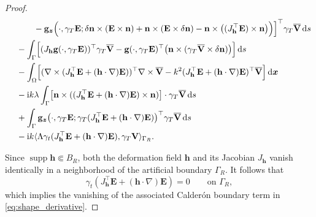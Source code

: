 \documentclass[12pt,reqno]{amsart}
\theoremstyle{definition}
\numberwithin{equation}{section}
\begin{document}
\begin{proof}
\begin{equation}
\begin{aligned}
&\qquad \quad - \mathbf{g}_{\boldsymbol{z}} \Bigl( \cdot, \gamma_T \mathbf{E}; \delta\mathbf{n} \times (\mathbf{E} \times \mathbf{n}) + \mathbf{n} \times (\mathbf{E} \times \delta \mathbf{n}) - \mathbf{n} \times \bigl( (J_{\mathbf{h}}^{\top}\mathbf{E}) \times \mathbf{n} \bigr) \Bigr) \Bigr]^{\top} \gamma_T\overline{\mathbf{V}} \, \mathrm{d}s \\
&\quad - \int_\Gamma \Bigl[ (J_{\mathbf{h}}\mathbf{g}(\cdot, \gamma_T \mathbf{E}))^{\top} \gamma_T\overline{\mathbf{V}} - \mathbf{g}(\cdot, \gamma_T \mathbf{E})^{\top} \bigl( \mathbf{n} \times (\gamma_T\overline{\mathbf{V}} \times \delta \mathbf{n}) \bigr) \Bigr] \, \mathrm{d}s \\
&\quad - \int_\Omega \Bigl[ (\nabla \times (J_{\mathbf{h}}^{\top}\mathbf{E} + (\mathbf{h} \cdot \nabla) \mathbf{E}))^{\top} \nabla \times \overline{\mathbf{V}} - k^2 (J_{\mathbf{h}}^{\top}\mathbf{E} + (\mathbf{h} \cdot \nabla) \mathbf{E})^{\top} \overline{\mathbf{V}} \Bigr] \, \mathrm{d}\boldsymbol{x} \\
&\quad - \mathrm{i}k\lambda \int_\Gamma \bigl[ \mathbf{n} \times ((J_{\mathbf{h}}^{\top}\mathbf{E} + (\mathbf{h} \cdot \nabla) \mathbf{E}) \times \mathbf{n}) \bigr] \cdot \gamma_T\overline{\mathbf{V}} \, \mathrm{d}s \\
&\quad + \int_\Gamma \mathbf{g}_{\boldsymbol{z}} \bigl( \cdot, \gamma_T \mathbf{E}; \gamma_T(J_{\mathbf{h}}^{\top}\mathbf{E} + (\mathbf{h} \cdot \nabla) \mathbf{E}) \bigr)^{\top} \gamma_T\overline{\mathbf{V}} \, \mathrm{d}s \\
&\quad - \mathrm{i}k \langle \Lambda \gamma_t (J_{\mathbf{h}}^{\top}\mathbf{E} + (\mathbf{h} \cdot \nabla) \mathbf{E}), \gamma_T \mathbf{V} \rangle_{\Gamma_R}.
\end{aligned}
\end{equation}

Since $\operatorname{supp} \mathbf{h} \Subset B_R$, both the deformation field $\mathbf{h}$ and its Jacobian $J_{\mathbf{h}}$ vanish identically in a neighborhood of the artificial boundary $\Gamma_R$. It follows that
\[
\gamma_t(J_{\mathbf{h}}^{\top}\mathbf{E} + (\mathbf{h} \cdot \nabla) \mathbf{E}) = 0 \qquad \text{on } \Gamma_R,
\]
which implies the vanishing of the associated Calder\'on boundary term in \eqref{eq:shape_derivative}.




\end{proof}
\end{document}

